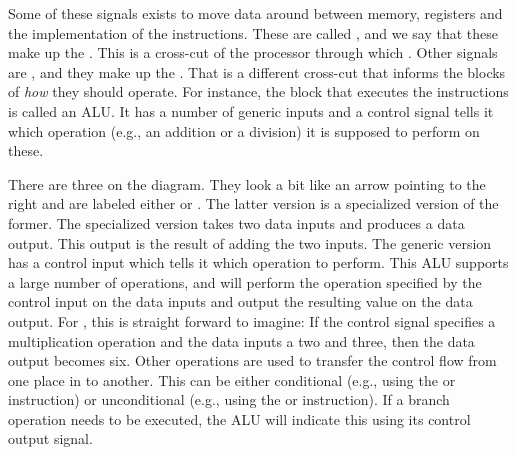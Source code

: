Some of these signals exists to move data around between memory, registers and the implementation of the instructions. These are called , and we say that these make up the . This is a cross-cut of the processor through which . Other signals are , and they make up the . That is a different cross-cut that informs the blocks of \textsl{how} they should operate. For instance, the block that executes the instructions is called an ALU. It has a number of generic inputs and a control signal tells it which operation (e.g., an addition or a division) it is supposed to perform on these.

There are three  on the diagram. They look a bit like an arrow pointing to the right and are labeled either  or \say{+}. The latter version is a specialized version of the former. The specialized version takes two data inputs and produces a data output. This output is the result of adding the two inputs. The generic version has a control input which tells it which operation to perform. This ALU supports a large number of operations, and will perform the operation specified by the control input on the data inputs and output the resulting value on the data output. For , this is straight forward to imagine: If the control signal specifies a multiplication operation and the data inputs a two and three, then the data output becomes six. Other operations are used to transfer the control flow from one place in  to another. This can be either conditional (e.g., using the  or  instruction) or unconditional (e.g., using the  or  instruction). If a branch operation needs to be executed, the ALU will indicate this using its control output signal.

